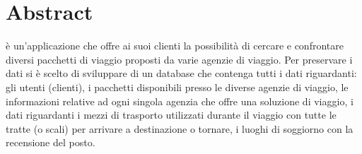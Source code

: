 \section{Abstract}
\AppName è un'applicazione che offre ai suoi clienti la possibilità di cercare e confrontare diversi pacchetti di viaggio proposti da varie agenzie di viaggio. Per preservare i dati si è scelto di sviluppare di un database che contenga tutti i dati riguardanti: gli utenti (clienti), i pacchetti disponibili presso le diverse agenzie di viaggio, le informazioni relative ad ogni singola agenzia che offre una soluzione di viaggio, i dati riguardanti i mezzi di trasporto utilizzati durante il viaggio con tutte le tratte (o scali) per arrivare a destinazione o tornare, i luoghi di soggiorno con la recensione del posto.